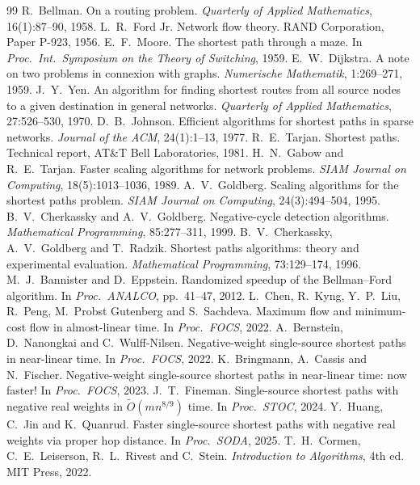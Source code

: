 \documentclass[11pt,a4paper]{article}
\theoremstyle{definition}
\newcommand{\Ot}{\tilde{O}}
\begin{document}
\begin{thebibliography}{99}\small
{} R.~Bellman. On a routing problem. \emph{Quarterly of Applied Mathematics}, 16(1):87--90, 1958.
 L.~R.~Ford Jr. Network flow theory. RAND Corporation, Paper P-923, 1956.
 E.~F.~Moore. The shortest path through a maze. In \emph{Proc.\ Int.\ Symposium on the Theory of Switching}, 1959.
 E.~W.~Dijkstra. A note on two problems in connexion with graphs. \emph{Numerische Mathematik}, 1:269--271, 1959.
 J.~Y.~Yen. An algorithm for finding shortest routes from all source nodes to a given destination in general networks. \emph{Quarterly of Applied Mathematics}, 27:526--530, 1970.
 D.~B.~Johnson. Efficient algorithms for shortest paths in sparse networks. \emph{Journal of the ACM}, 24(1):1--13, 1977.
 R.~E.~Tarjan. Shortest paths. Technical report, AT\&T Bell Laboratories, 1981.
 H.~N.~Gabow and R.~E.~Tarjan. Faster scaling algorithms for network problems. \emph{SIAM Journal on Computing}, 18(5):1013--1036, 1989.
 A.~V.~Goldberg. Scaling algorithms for the shortest paths problem. \emph{SIAM Journal on Computing}, 24(3):494--504, 1995.
 B.~V.~Cherkassky and A.~V.~Goldberg. Negative-cycle detection algorithms. \emph{Mathematical Programming}, 85:277--311, 1999.
 B.~V.~Cherkassky, A.~V.~Goldberg and T.~Radzik. Shortest paths algorithms: theory and experimental evaluation. \emph{Mathematical Programming}, 73:129--174, 1996.
 M.~J.~Bannister and D.~Eppstein. Randomized speedup of the Bellman--Ford algorithm. In \emph{Proc.\ ANALCO}, pp.\ 41--47, 2012.
 L.~Chen, R.~Kyng, Y.~P.~Liu, R.~Peng, M.~Probst Gutenberg and S.~Sachdeva. Maximum flow and minimum-cost flow in almost-linear time. In \emph{Proc.\ FOCS}, 2022.
 A.~Bernstein, D.~Nanongkai and C.~Wulff-Nilsen. Negative-weight single-source shortest paths in near-linear time. In \emph{Proc.\ FOCS}, 2022.
 K.~Bringmann, A.~Cassis and N.~Fischer. Negative-weight single-source shortest paths in near-linear time: now faster! In \emph{Proc.\ FOCS}, 2023.
 J.~T.~Fineman. Single-source shortest paths with negative real weights in $\Ot(mn^{8/9})$ time. In \emph{Proc.\ STOC}, 2024.
 Y.~Huang, C.~Jin and K.~Quanrud. Faster single-source shortest paths with negative real weights via proper hop distance. In \emph{Proc.\ SODA}, 2025.
 T.~H.~Cormen, C.~E.~Leiserson, R.~L.~Rivest and C.~Stein. \emph{Introduction to Algorithms}, 4th ed. MIT Press, 2022.
\end{thebibliography}
\end{document}
